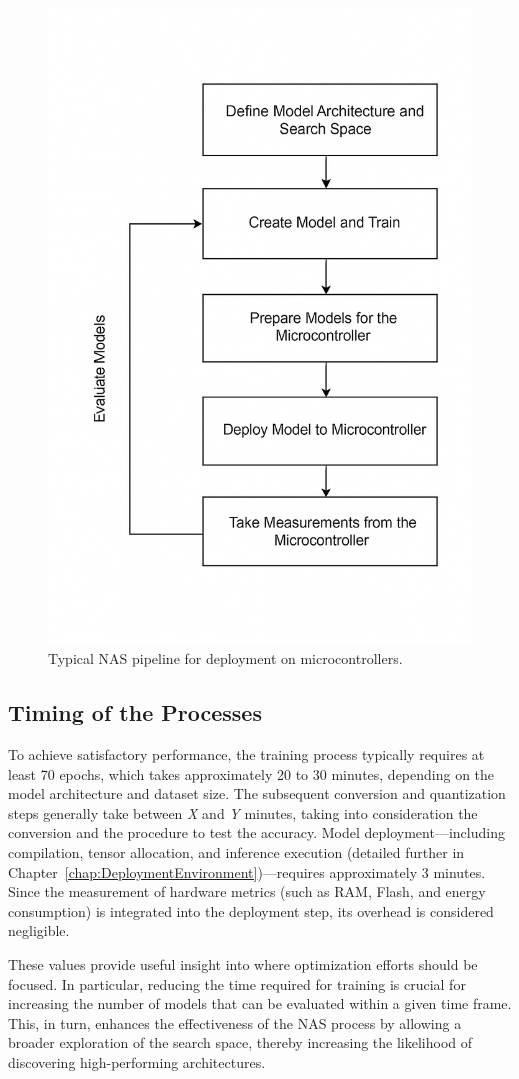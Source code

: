 \begin{figure}[ht]
    \centering
    \includegraphics[width=0.6\linewidth]{Pictures/OldMethodology.png}
    \caption{Typical NAS pipeline for deployment on microcontrollers.}
    \label{fig:architectural_pipeline}
\end{figure}



\subsection{Timing of the Processes}

To achieve satisfactory performance, the training process typically requires at least 70 epochs, which takes approximately 20 to 30 minutes, depending on the model architecture and dataset size. The subsequent conversion and quantization steps generally take between \textit{X} and \textit{Y} minutes, taking into consideration the conversion and the procedure to test the accuracy. Model deployment—including compilation, tensor allocation, and inference execution (detailed further in Chapter~\ref{chap:DeploymentEnvironment})—requires approximately 3 minutes. Since the measurement of hardware metrics (such as RAM, Flash, and energy consumption) is integrated into the deployment step, its overhead is considered negligible.

These values provide useful insight into where optimization efforts should be focused. In particular, reducing the time required for training is crucial for increasing the number of models that can be evaluated within a given time frame. This, in turn, enhances the effectiveness of the NAS process by allowing a broader exploration of the search space, thereby increasing the likelihood of discovering high-performing architectures.

